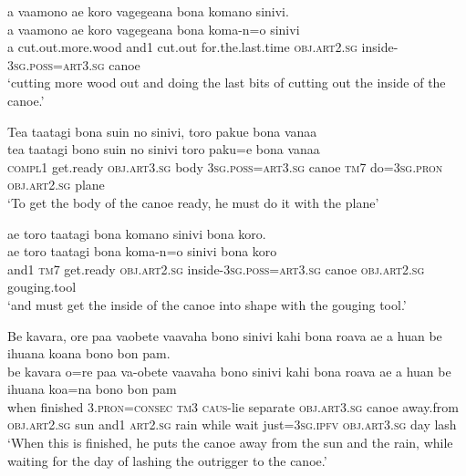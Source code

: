 \ea\label{ex:text16-26}
a vaamono ae koro vagegeana bona komano sinivi.\\
\gll a	vaamono	ae	koro	vagegeana	bona	koma-n=o	sinivi\\
     a	cut.out.more.wood	and1	cut.out	for.the.last.time	\textsc{obj}.\textsc{art}2.\textsc{sg}	inside-3\textsc{sg}.\textsc{poss}=\textsc{art}3.\textsc{sg}	canoe\\
\glt `cutting more wood out and doing the last bits of cutting out the inside of the canoe.'
\z

\ea\label{ex:text16-27}
Tea taatagi bona suin no sinivi, toro pakue bona vanaa\\
\gll tea	taatagi	bono	suin	no	sinivi	toro	paku=e	bona	vanaa\\
     \textsc{compl}1	get.ready	\textsc{obj}.\textsc{art}3.\textsc{sg}	body	3\textsc{sg}.\textsc{poss}=\textsc{art}3.\textsc{sg}	canoe	\textsc{tm}7	do=3\textsc{sg}.\textsc{pron}	\textsc{obj}.\textsc{art}2.\textsc{sg}	plane\\
\glt `To get the body of the canoe ready, he must do it with the plane'
\z

\ea\label{ex:text16-28}
ae toro taatagi bona komano sinivi bona koro.\\
\gll ae	toro	taatagi	bona	koma-n=o	sinivi	bona	koro\\
     and1	\textsc{tm}7	get.ready	\textsc{obj}.\textsc{art}2.\textsc{sg}	inside-3\textsc{sg}.\textsc{poss}=\textsc{art}3.\textsc{sg}	canoe	\textsc{obj}.\textsc{art}2.\textsc{sg}	gouging.tool\\
\glt `and must get the inside of the canoe into shape with the gouging tool.'
\z

\ea\label{ex:text16-29}
Be kavara, ore paa vaobete vaavaha bono sinivi kahi bona roava ae a huan be ihuana koana bono bon pam.\\
\gll be	kavara	o=re	paa	va-obete	vaavaha	bono	sinivi	kahi	bona	roava	ae	a	huan	be	ihuana	koa=na	bono	bon	pam\\
     when	finished	3.\textsc{pron}=\textsc{consec}	\textsc{tm}3	\textsc{caus}-lie	separate	\textsc{obj}.\textsc{art}3.\textsc{sg}	canoe	away.from	\textsc{obj}.\textsc{art}2.\textsc{sg}	sun	and1	\textsc{art}2.\textsc{sg}	rain	while	wait	just=3\textsc{sg}.\textsc{ipfv}	\textsc{obj}.\textsc{art}3.\textsc{sg}	day	lash\\
\glt `When this is finished, he puts the canoe away from the sun and the rain, while waiting for the day of lashing the outrigger to the canoe.'
\z
